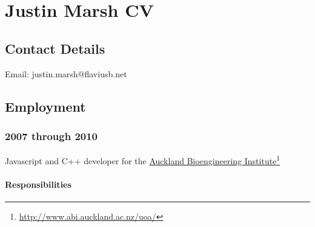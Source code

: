 \documentclass[10pt,oneside]{memoir}
\title{\mytitle}
\author{\myauthor}
\def\mychapterstyle{article}
\def\mypagestyle{headings}
\begin{document}
\chapterstyle{\mychapterstyle}
\pagestyle{\mypagestyle}

%
%

\frontmatter




%
%


\setlength{\parindent}{1em}

\mainmatter
\chapter*{Justin Marsh CV}
\label{justinmarsh}

{}
\section*{Contact Details}
\label{contactdetails}

Email: justin.marsh@flaviusb.net



{}
\section*{Employment}
\label{employment}

\subsection*{2007 through 2010}
\label{through2010}

Javascript and C++ developer for the \href{http://www.abi.auckland.ac.nz/uoa/}{Auckland Bioengineering Institute}\footnote{\href{http://www.abi.auckland.ac.nz/uoa/}{http://www.abi.auckland.ac.nz/uoa/}}


\subsubsection*{Responsibilities}
\label{responsibilities}
\end{document}
